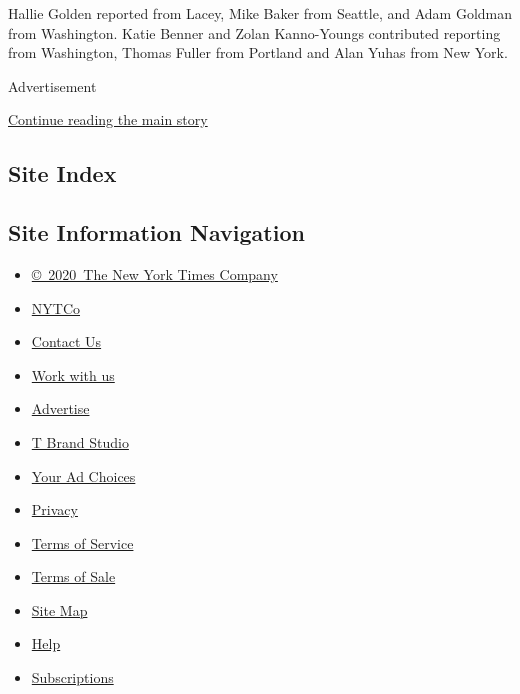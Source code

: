 Hallie Golden reported from Lacey, Mike Baker from Seattle, and Adam
Goldman from Washington. Katie Benner and Zolan Kanno-Youngs contributed
reporting from Washington, Thomas Fuller from Portland and Alan Yuhas
from New York.

Advertisement

\protect\hyperlink{after-bottom}{Continue reading the main story}

\hypertarget{site-index}{%
\subsection{Site Index}\label{site-index}}

\hypertarget{site-information-navigation}{%
\subsection{Site Information
Navigation}\label{site-information-navigation}}

\begin{itemize}
\tightlist
\item
  \href{https://help.nytimes3xbfgragh.onion/hc/en-us/articles/115014792127-Copyright-notice}{©~2020~The
  New York Times Company}
\end{itemize}

\begin{itemize}
\tightlist
\item
  \href{https://www.nytco.com/}{NYTCo}
\item
  \href{https://help.nytimes3xbfgragh.onion/hc/en-us/articles/115015385887-Contact-Us}{Contact
  Us}
\item
  \href{https://www.nytco.com/careers/}{Work with us}
\item
  \href{https://nytmediakit.com/}{Advertise}
\item
  \href{http://www.tbrandstudio.com/}{T Brand Studio}
\item
  \href{https://www.nytimes3xbfgragh.onion/privacy/cookie-policy\#how-do-i-manage-trackers}{Your
  Ad Choices}
\item
  \href{https://www.nytimes3xbfgragh.onion/privacy}{Privacy}
\item
  \href{https://help.nytimes3xbfgragh.onion/hc/en-us/articles/115014893428-Terms-of-service}{Terms
  of Service}
\item
  \href{https://help.nytimes3xbfgragh.onion/hc/en-us/articles/115014893968-Terms-of-sale}{Terms
  of Sale}
\item
  \href{https://spiderbites.nytimes3xbfgragh.onion}{Site Map}
\item
  \href{https://help.nytimes3xbfgragh.onion/hc/en-us}{Help}
\item
  \href{https://www.nytimes3xbfgragh.onion/subscription?campaignId=37WXW}{Subscriptions}
\end{itemize}
